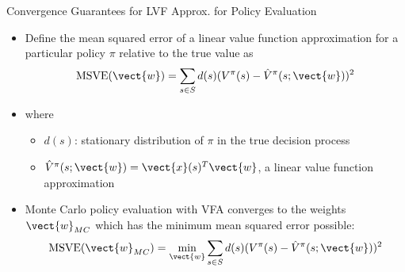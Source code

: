 \documentclass[aspectratio=169]{../latex_main/tntbeamer}  %
\begin{document}
\begin{frame}[c]{Convergence Guarantees for LVF
		Approx. for Policy Evaluation}

	\begin{itemize}
		\item Define the mean squared error of a linear value function approximation for a particular policy $\pi$  relative to the true value as 
		$$\text{MSVE}(\vect{w}) = \sum_{s \in S} d(s) (V^\pi (s) - \hat{V}^\pi(s;\vect{w}))^2 $$
		\item where
		\begin{itemize}
			\item $d(s)$: stationary distribution of $\pi$ in the true decision process
			\item $\hat{V}^\pi(s;\vect{w}) = \vect{x}(s)^T\vect{w}$, a linear value function approximation
		\end{itemize}
		\item Monte Carlo policy evaluation with VFA converges to the weights $\vect{w}_{MC}$ which has the minimum mean squared error possible:
		$$\text{MSVE}(\vect{w}_{MC}) = \min_{\vect{w}}\sum_{s \in S} d(s) (V^\pi (s) - \hat{V}^\pi(s;\vect{w}))^2 $$
	\end{itemize}
	
\end{frame}
\end{document}
